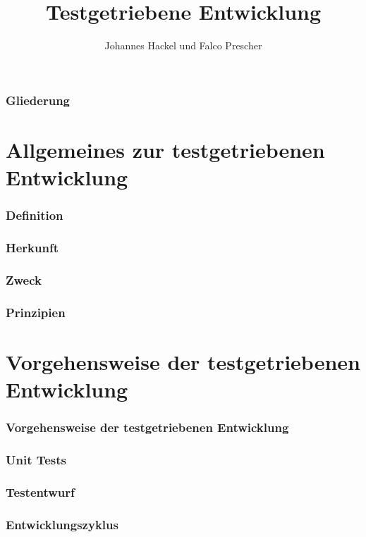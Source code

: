 \documentclass{beamer}
\author{Johannes Hackel und Falco Prescher}
\title{Testgetriebene Entwicklung}
\begin{document}
\begin{frame}
\titlepage
\end{frame}

\begin{frame}
\frametitle{Gliederung}
\tableofcontents
\end{frame}

\section{Allgemeines zur testgetriebenen Entwicklung}
\begin{frame}
\frametitle{Definition}
\end{frame}

\begin{frame}
\frametitle{Herkunft}
\end{frame}

\begin{frame}
\frametitle{Zweck}
\end{frame}

\begin{frame}
\frametitle{Prinzipien}
\end{frame}

\section{Vorgehensweise der testgetriebenen Entwicklung}
\begin{frame}
\frametitle{Vorgehensweise der testgetriebenen Entwicklung}
\end{frame}

\begin{frame}
\frametitle{Unit Tests}
\end{frame}

\begin{frame}
\frametitle{Testentwurf}
\end{frame}

\begin{frame}
\frametitle{Entwicklungszyklus}
\end{frame}
\end{document}
